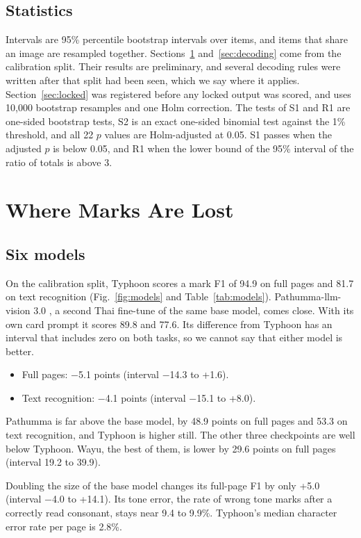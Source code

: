 \subsection{Statistics}
Intervals are 95\% percentile bootstrap intervals over items, and items that share an image are resampled together. Sections~\ref{sec:where} and~\ref{sec:decoding} come from the calibration split. Their results are preliminary, and several decoding rules were written after that split had been seen, which we say where it applies. Section~\ref{sec:locked} was registered before any locked output was scored, and uses 10,000 bootstrap resamples and one Holm correction. The tests of S1 and R1 are one-sided bootstrap tests, S2 is an exact one-sided binomial test against the 1\% threshold, and all 22 $p$ values are Holm-adjusted at 0.05. S1 passes when the adjusted $p$ is below 0.05, and R1 when the lower bound of the 95\% interval of the ratio of totals is above 3.

\section{Where Marks Are Lost}\label{sec:where}
\subsection{Six models}
On the calibration split, Typhoon scores a mark F1 of 94.9 on full pages and 81.7 on text recognition (Fig.~\ref{fig:models} and Table~\ref{tab:models}). Pathumma-llm-vision 3.0 \cite{nectec2026pathumma}, a second Thai fine-tune of the same base model, comes close. With its own card prompt it scores 89.8 and 77.6. Its difference from Typhoon has an interval that includes zero on both tasks, so we cannot say that either model is better.
\begin{itemize}
\item Full pages: $-$5.1 points (interval $-$14.3 to +1.6).
\item Text recognition: $-$4.1 points (interval $-$15.1 to +8.0).
\end{itemize}
Pathumma is far above the base model, by 48.9 points on full pages and 53.3 on text recognition, and Typhoon is higher still. The other three checkpoints are well below Typhoon. Wayu, the best of them, is lower by 29.6 points on full pages (interval 19.2 to 39.9).

Doubling the size of the base model changes its full-page F1 by only +5.0 (interval $-$4.0 to +14.1). Its tone error, the rate of wrong tone marks after a correctly read consonant, stays near 9.4 to 9.9\%. Typhoon's median character error rate per page is 2.8\%.

